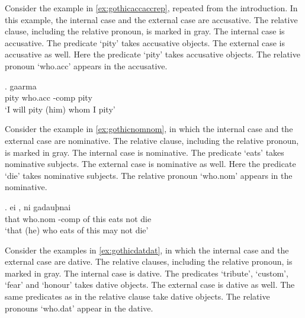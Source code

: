 Consider the example in \ref{ex:gothicaccaccrep}, repeated from the introduction. In this example, the internal case and the external case are accusative.
The relative clause, including the relative pronoun, is marked in gray.
The internal case is accusative. The predicate  `pity' takes accusative objects.
The external case is accusative as well. Here the predicate  `pity' takes accusative objects.
The relative pronoun  `who.\ac{acc}' appears in the accusative.

\exg. gaarma   \\
 pity\scsub{[acc]} who.\ac{acc} -\ac{comp} pity\scsub{[acc]}\\
 `I will pity (him) whom I pity' \label{ex:gothicaccaccrep}

Consider the example in \ref{ex:gothicnomnom}, in which the internal case and the external case are nominative.
The relative clause, including the relative pronoun, is marked in gray.
The internal case is nominative. The predicate  `eats' takes nominative subjects.
The external case is nominative as well. Here the predicate  `die' takes nominative subjects.
The relative pronoun  `who.\ac{nom}' appears in the nominative.

\exg. ei    , ni gadauþnai\\
 that who.\ac{nom} -\ac{comp} {of this} eats\scsub{[nom]} not die\scsub{[nom]}\\
 `that (he) who eats of this may not die' \label{ex:gothicnomnom}


Consider the examples in \ref{ex:gothicdatdat}, in which the internal case and the external case are dative.
The relative clauses, including the relative pronoun, is marked in gray.
The internal case is dative. The predicates  `tribute',  `custom',  `fear' and  `honour' takes dative objects.
The external case is dative as well. The same predicates as in the relative clause take dative objects.
The relative pronouns  `who.\ac{dat}' appear in the dative.


